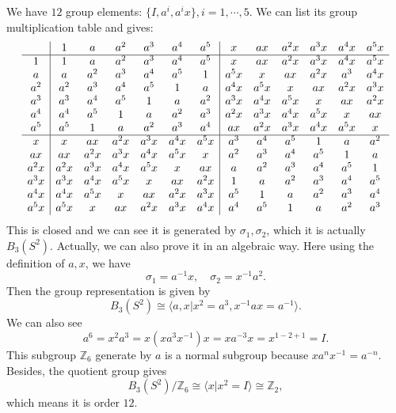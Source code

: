 \documentclass{book}
\begin{document}
We have $12$ group elements: $\{I,a^{i} ,a^{i} x\},i=1,\cdots ,5$. We can list its group multiplication table and gives:
\begin{equation*}
\begin{array}{ c|c c c c c c|c c c c c c }
 & 1 & a & a^{2} & a^{3} & a^{4} & a^{5} & x & ax & a^{2} x & a^{3} x & a^{4} x & a^{5} x\\
\hline
1 & 1 & a & a^{2} & a^{3} & a^{4} & a^{5} & x & ax & a^{2} x & a^{3} x & a^{4} x & a^{5} x\\
a & a & a^{2} & a^{3} & a^{4} & a^{5} & 1 & a^{5} x & x & ax & a^{2} x & a^{3} & a^{4} x\\
a^{2} & a^{2} & a^{3} & a^{4} & a^{5} & 1 & a & a^{4} x & a^{5} x & x & ax & a^{2} x & a^{3} x\\
a^{3} & a^{3} & a^{4} & a^{5} & 1 & a & a^{2} & a^{3} x & a^{4} x & a^{5} x & x & ax & a^{2} x\\
a^{4} & a^{4} & a^{5} & 1 & a & a^{2} & a^{3} & a^{2} x & a^{3} x & a^{4} x & a^{5} x & x & ax\\
a^{5} & a^{5} & 1 & a & a^{2} & a^{3} & a^{4} & ax & a^{2} x & a^{3} x & a^{4} x & a^{5} x & x\\
\hline
x & x & ax & a^{2} x & a^{3} x & a^{4} x & a^{5} x & a^{3} & a^{4} & a^{5} & 1 & a & a^{2}\\
ax & ax & a^{2} x & a^{3} x & a^{4} x & a^{5} x & x & a^{2} & a^{3} & a^{4} & a^{5} & 1 & a\\
a^{2} x & a^{2} x & a^{3} x & a^{4} x & a^{5} x & x & ax & a & a^{2} & a^{3} & a^{4} & a^{5} & 1\\
a^{3} x & a^{3} x & a^{4} x & a^{5} x & x & ax & a^{2} x & 1 & a & a^{2} & a^{3} & a^{4} & a^{5}\\
a^{4} x & a^{4} x & a^{5} x & x & ax & a^{2} x & a^{3} x & a^{5} & 1 & a & a^{2} & a^{3} & a^{4}\\
a^{5} x & a^{5} x & x & ax & a^{2} x & a^{3} x & a^{4} x & a^{4} & a^{5} & 1 & a & a^{2} & a^{3}
\end{array}
\end{equation*}
This is closed and we can see it is generated by $\sigma _{1} ,\sigma _{2}$, which it is actually $B_{3} (S^{2} )$. Actually, we can also prove it in an algebraic way. Here using the definition of $a,x$, we have
\begin{equation*}
\sigma _{1} =a^{-1} x,\quad \sigma _{2} =x^{-1} a^{2} .
\end{equation*}
Then the group representation is given by
\begin{equation*}
B_{3} (S^{2} )\cong \langle a,x|x^{2} =a^{3} ,x^{-1} ax=a^{-1} \rangle .
\end{equation*}
We can also see
\begin{equation*}
a^{6} =x^{2} a^{3} =x(xa^{3} x^{-1} )x=xa^{-3} x=x^{1-2+1} =I.
\end{equation*}
This subgroup $\mathbb{Z}_{6}$ generate by $a$ is a normal subgroup because $xa^{n} x^{-1} =a^{-n}$. Besides, the quotient group gives
\begin{equation*}
B_{3} (S^{2} )/\mathbb{Z}_{6} \cong \langle x|x^{2} =I\rangle \cong \mathbb{Z}_{2} ,
\end{equation*}
which means it is order $12$. 
\end{document}
